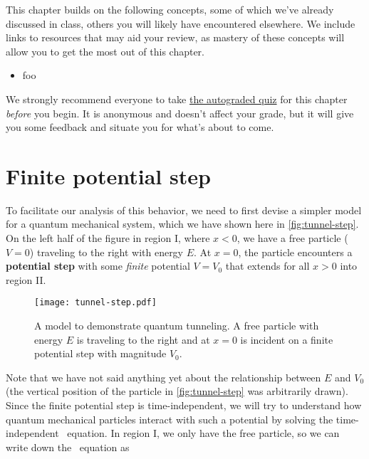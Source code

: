 This chapter builds on the following concepts, some of which we've already discussed in class, others you will likely have encountered elsewhere.
We include links to resources that may aid your review, as mastery of these concepts will allow you to get the most out of this chapter.

\begin{itemize}
	\item foo
\end{itemize}

\begin{tcolorbox}[colframe=PaloAlto, colbacktitle=PaloAlto!20!white, title=Pre-check quiz]
	We strongly recommend everyone to take \href{TODO}{the autograded quiz} for this chapter \emph{before} you begin.
	It is anonymous and doesn't affect your grade, but it will give you some feedback and situate you for what's about to come.
\end{tcolorbox}


\section{Finite potential step}

To facilitate our analysis of this behavior, we need to first devise a simpler model for a quantum mechanical system, which we have shown here in \autoref{fig:tunnel-step}. 
On the left half of the figure in region I, where $x < 0$, we have a free particle ($V = 0$) traveling to the right with energy $E$. 
At $x = 0$, the particle encounters a \textbf{potential step} with some \emph{finite} potential $V = V_0$ that extends for all $x > 0$ into region II.

\begin{figure}[!h]
	\centering
	\texttt{[image: tunnel-step.pdf]}
	\caption{A model to demonstrate quantum tunneling. 
	A free particle with energy $E$ is traveling to the right and at $x=0$ is incident on a finite potential step with magnitude $V_0$.}
	\label{fig:tunnel-step}
\end{figure}

Note that we have not said anything yet about the relationship between $E$ and $V_0$ (the vertical position of the particle in \autoref{fig:tunnel-step} was arbitrarily drawn). 
Since the finite potential step is time-independent, we will try to understand how quantum mechanical particles interact with such a potential by solving the time-independent \Sch\ equation. 
In region I, we only have the free particle, so we can write down the \Sch\ equation as 

